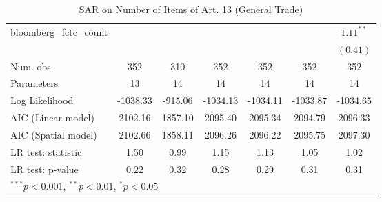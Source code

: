 \begin{table}[!h]
\begin{center}
\begin{tabular}{l c c c c c c }
bloomberg\_fctc\_count  &              &              &              &              &              & $1.11^{**}$  \\
                        &              &              &              &              &              & $(0.41)$     \\
\midrule
Num. obs.               & 352          & 310          & 352          & 352          & 352          & 352          \\
Parameters              & 13           & 14           & 14           & 14           & 14           & 14           \\
Log Likelihood          & -1038.33     & -915.06      & -1034.13     & -1034.11     & -1033.87     & -1034.65     \\
AIC (Linear model)      & 2102.16      & 1857.10      & 2095.40      & 2095.34      & 2094.79      & 2096.33      \\
AIC (Spatial model)     & 2102.66      & 1858.11      & 2096.26      & 2096.22      & 2095.75      & 2097.30      \\
LR test: statistic      & 1.50         & 0.99         & 1.15         & 1.13         & 1.05         & 1.02         \\
LR test: p-value        & 0.22         & 0.32         & 0.28         & 0.29         & 0.31         & 0.31         \\
\bottomrule
\multicolumn{7}{l}{\scriptsize{$^{***}p<0.001$, $^{**}p<0.01$, $^*p<0.05$}}
\end{tabular}
\caption{SAR on Number of Items of Art. 13 (General Trade)}
\label{table:coefficients}
\end{center}
\end{table}
